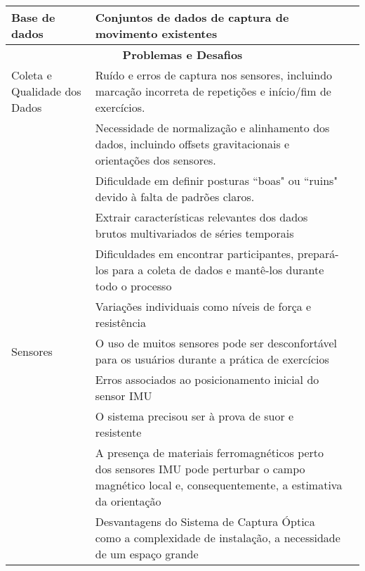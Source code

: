 \documentclass[conference]{IEEEtran}
\begin{document}
\begin{table*}
\begin{tabularx}{\textwidth}{|p{3cm}|X|p{3cm}|}
    Base de dados & Conjuntos de dados de captura de movimento existentes & \cite{Ponton2023, Asghar2023,Kwon2021} \\ \hline

    \multicolumn{3}{|c|}{\textbf{Problemas e Desafios}} \\ \hline

    Coleta e Qualidade dos Dados & Ruído e erros de captura nos sensores, incluindo marcação incorreta de repetições e início/fim de exercícios. & \cite{Tian2021, colpitts2023kinematics, Mekruksavanich2024, Kwon2021} \\ \cline{2-3}
    & Necessidade de normalização e alinhamento dos dados, incluindo offsets gravitacionais e orientações dos sensores. & \cite{Ponton2023} \\ \cline{2-3}
    & Dificuldade em definir posturas ``boas" ou ``ruins" devido à falta de padrões claros. & \cite{papadopoulou2023towards} \\ \cline{2-3}
    & Extrair características relevantes dos dados brutos multivariados de séries temporais & \cite{Mekruksavanich2024} \\ \cline{2-3}
    &  Dificuldades em encontrar participantes, prepará-los para a coleta de dados e mantê-los durante todo o processo & \cite{Hussain2022} \\ \cline{2-3}
    & Variações individuais como níveis de força e resistência & \cite{Hussain2022} \\ \hline


    
    Sensores & O uso de muitos sensores pode ser desconfortável para os usuários durante a prática de exercícios & \cite{Tian2021} \\ \cline{2-3}

    & Erros associados ao posicionamento inicial do sensor IMU & \cite{colpitts2023kinematics, Michaud2021,Hussain2022} \\ \cline{2-3}

    & O sistema precisou ser à prova de suor e resistente & \cite{Islam2021} \\ \cline{2-3}

    & A presença de materiais ferromagnéticos perto dos sensores IMU pode perturbar o campo magnético local e, consequentemente, a estimativa da orientação & \cite{Michaud2021} \\ \cline{2-3}

    & Desvantagens do Sistema de Captura Óptica como a complexidade de instalação, a necessidade de um espaço grande & \cite{Michaud2021} \\ \hline


\end{tabularx}
\end{table*}
\end{document}
